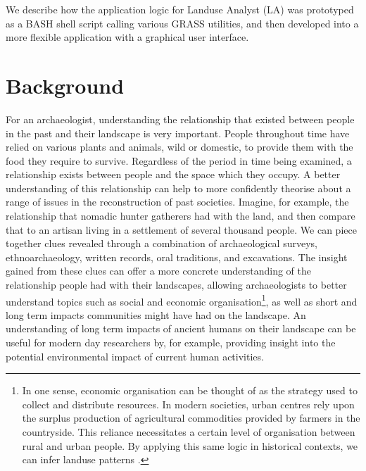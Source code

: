 We describe how the application logic for Landuse Analyst (LA) was prototyped as
a
BASH shell script calling various GRASS utilities, and then developed into a
more flexible application with a graphical user interface.

\section{Background} For an archaeologist, understanding
the relationship that existed between people in the past and their landscape is
very important.  People throughout time have relied on various plants and
animals, wild or domestic, to provide them with the food they require to
survive.  Regardless of the period in time being examined, a relationship
exists between people and the space which they occupy.  A better understanding
of this relationship can help to more confidently theorise about a range of
issues in the reconstruction of past societies.  Imagine, for example, the
relationship that nomadic hunter gatherers had with the land, and then compare
that to  an artisan living in a settlement of several thousand people.  We can
piece together clues revealed through a combination of archaeological surveys,
ethnoarchaeology, written records, oral traditions, and excavations. The
insight gained from these clues can offer a more concrete understanding of the
relationship people had with their landscapes, allowing archaeologists to
better understand topics such as social and economic organisation\footnote{In
one sense, economic organisation can be thought of as the strategy used to
collect and distribute resources.  In modern societies, urban centres rely upon
the surplus production of agricultural commodities provided by farmers in the
countryside.  This reliance necessitates a certain level of organisation
between rural and urban people.  By applying this same logic in historical
contexts, we can infer landuse patterns .}, as well as short and long term
impacts communities might have had on the landscape.  An understanding of long
term impacts of ancient humans on their landscape can be useful for modern day
researchers by, for example, providing insight into the potential environmental
impact of
current human activities.

